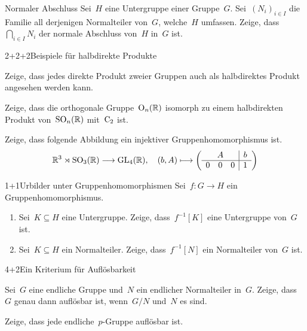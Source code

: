 \documentclass{algblatt}
\begin{document}

\begin{aufgabe}{2}{Normaler Abschluss}
Sei~$H$ eine Untergruppe einer Gruppe~$G$. Sei~$(N_i)_{i \in I}$ die Familie
all derjenigen Normalteiler von~$G$, welche~$H$ umfassen. Zeige,
dass~$\bigcap_{i \in I} N_i$ der normale Abschluss von~$H$ in~$G$ ist.
\end{aufgabe}

\begin{aufgabeE}{2+2+2}{Beispiele für halbdirekte Produkte}
\item Zeige, dass jedes direkte Produkt zweier Gruppen auch als halbdirektes
Produkt angesehen werden kann.
\item Zeige, dass die orthogonale Gruppe~$\mathrm{O}_n(\mathbb{R})$ isomorph zu einem
halbdirekten Produkt von~$\mathrm{SO}_n(\mathbb{R})$ mit~$\mathrm{C}_2$ ist.
\item Zeige, dass folgende Abbildung ein injektiver Gruppenhomomorphismus ist.
\[ \RR^3 \rtimes \SO_3(\RR) \longrightarrow \GL_4(\RR),\quad
  (b, A) \longmapsto \left(\begin{array}{ccc|c}
    \multicolumn{3}{c|}{A} & b \\\hline
    0 & 0 & 0 & 1
  \end{array}\right) \]
\end{aufgabeE}
\vspace{-1em}

\begin{aufgabe}{1+1}{Urbilder unter Gruppenhomomorphismen}
Sei~$f : G \to H$ ein Gruppenhomomorphismus.
\begin{enumerate}
\item Sei~$K \subseteq H$ eine Untergruppe. Zeige, dass~$f^{-1}[K]$
eine Untergruppe von~$G$ ist.
\item Sei~$K \subseteq H$ ein Normalteiler. Zeige, dass~$f^{-1}[N]$
ein Normalteiler von~$G$ ist.
\end{enumerate}
\end{aufgabe}

\begin{aufgabeE}{4+2}{Ein Kriterium für Auflösbarkeit}
\item Sei~$G$ eine endliche Gruppe und~$N$ ein endlicher Normalteiler in~$G$.
Zeige, dass~$G$ genau dann auflösbar ist, wenn~$G/N$ und~$N$ es sind.
\item Zeige, dass jede endliche~$p$-Gruppe auflösbar ist.
\end{aufgabeE}
\end{document}
